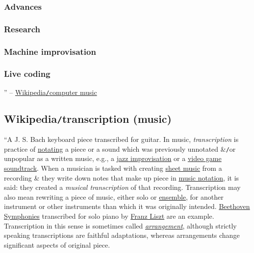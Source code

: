 \documentclass{article}
\begin{document}
\subsubsection{Advances}

\subsubsection{Research}

\subsubsection{Machine improvisation}

\subsubsection{Live coding}

'' -- \href{https://en.wikipedia.org/wiki/Computer_music}{Wikipedia{\tt/}computer music}


\subsection{Wikipedia{\tt/}transcription (music)}
``{\sf A {\sc J. S. Bach} keyboard piece transcribed for guitar.} In music, {\it transcription} is practice of \href{https://en.wikipedia.org/wiki/Musical_notation}{notating} a piece or a sound which was previously unnotated \&{\tt/}or unpopular as a written music, e.g., a \href{https://en.wikipedia.org/wiki/Jazz_improvisation}{jazz improvisation} or a \href{https://en.wikipedia.org/wiki/Video_game_soundtrack}{video game soundtrack}. When a musician is tasked with creating \href{https://en.wikipedia.org/wiki/Sheet_music}{sheet music} from a recording \& they write down notes that make up piece in \href{https://en.wikipedia.org/wiki/Music_notation}{music notation}, it is said: they created a {\it musical transcription} of that recording. Transcription may also mean rewriting a piece of music, either solo or \href{https://en.wikipedia.org/wiki/Musical_ensemble}{ensemble}, for another instrument or other instruments than which it was originally intended. \href{https://en.wikipedia.org/wiki/Beethoven_Symphonies_(Liszt)}{Beethoven Symphonies} transcribed for solo piano by \href{https://en.wikipedia.org/wiki/Franz_Liszt}{Franz Liszt} are an example. Transcription in this sense is sometimes called \href{https://en.wikipedia.org/wiki/Arrangement}{\it arrangement}, although strictly speaking transcriptions are faithful adaptations, whereas arrangements change significant aspects of original piece.
\end{document}
